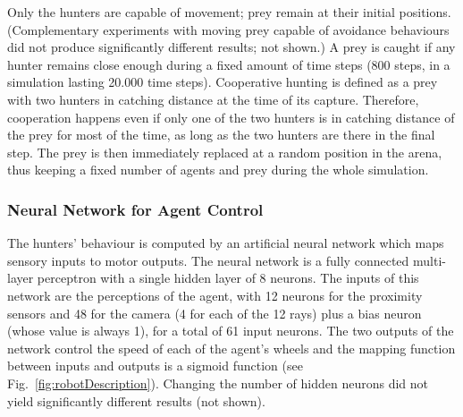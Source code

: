       Only the hunters are capable of movement; prey remain at their initial positions. (Complementary experiments with moving prey capable of avoidance behaviours did not produce significantly different results; not shown.) A prey is caught if any hunter remains close enough during a fixed amount of time steps (800 steps, in a simulation lasting 20.000 time steps). Cooperative hunting is defined as a prey with two hunters in catching distance at the time of its capture. Therefore, cooperation happens even if only one of the two hunters is in catching distance of the prey for most of the time, as long as the two hunters are there in the final step. The prey is then immediately replaced at a random position in the arena, thus keeping a fixed number of agents and prey during the whole simulation.


    \subsubsection{Neural Network for Agent Control}
    \label{nn}
      The hunters' behaviour is computed by an artificial neural network which maps sensory inputs to motor outputs. The neural network is a fully connected multi-layer perceptron with a single hidden layer of 8 neurons. The inputs of this network are the perceptions of the agent, with 12 neurons for the proximity sensors and 48 for the camera (4 for each of the 12 rays) plus a bias neuron (whose value is always 1), for a total of 61 input neurons. The two outputs of the network control the speed of each of the agent's wheels and the mapping function between inputs and outputs is a sigmoid function (see Fig.~\ref{fig:robotDescription}). Changing the number of hidden neurons did not yield significantly different results (not shown).

